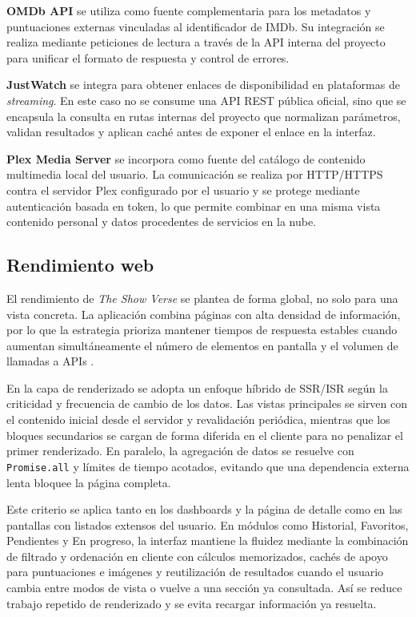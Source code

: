 \textbf{OMDb API} \parencite{OMDb:2024} se utiliza como fuente complementaria para los metadatos y puntuaciones externas vinculadas al identificador de IMDb. Su integración se realiza mediante peticiones de lectura a través de la API interna del proyecto para unificar el formato de respuesta y control de errores.

\textbf{JustWatch} \parencite{JustWatch:2024} se integra para obtener enlaces de disponibilidad en plataformas de \textit{streaming}. En este caso no se consume una API REST pública oficial, sino que se encapsula la consulta en rutas internas del proyecto que normalizan parámetros, validan resultados y aplican caché antes de exponer el enlace en la interfaz.

\textbf{Plex Media Server} \parencite{Plex:2024} se incorpora como fuente del catálogo de contenido multimedia local del usuario. La comunicación se realiza por HTTP/HTTPS contra el servidor Plex configurado por el usuario y se protege mediante autenticación basada en token, lo que permite combinar en una misma vista contenido personal y datos procedentes de servicios en la nube.

\subsection{Rendimiento web}

El rendimiento de \textit{The Show Verse} se plantea de forma global, no solo para una vista concreta. La aplicación combina páginas con alta densidad de información, por lo que la estrategia prioriza mantener tiempos de respuesta estables cuando aumentan simultáneamente el número de elementos en pantalla y el volumen de llamadas a APIs \parencite{Google:2024a,Google:2024b}.

En la capa de renderizado se adopta un enfoque híbrido de SSR/ISR según la criticidad y frecuencia de cambio de los datos. Las vistas principales se sirven con el contenido inicial desde el servidor y revalidación periódica, mientras que los bloques secundarios se cargan de forma diferida en el cliente para no penalizar el primer renderizado. En paralelo, la agregación de datos se resuelve con \texttt{Promise.all} y límites de tiempo acotados, evitando que una dependencia externa lenta bloquee la página completa.

Este criterio se aplica tanto en los dashboards y la página de detalle como en las pantallas con listados extensos del usuario. En módulos como Historial, Favoritos, Pendientes y En progreso, la interfaz mantiene la fluidez mediante la combinación de filtrado y ordenación en cliente con cálculos memorizados, cachés de apoyo para puntuaciones e imágenes y reutilización de resultados cuando el usuario cambia entre modos de vista o vuelve a una sección ya consultada. Así se reduce trabajo repetido de renderizado y se evita recargar información ya resuelta.


